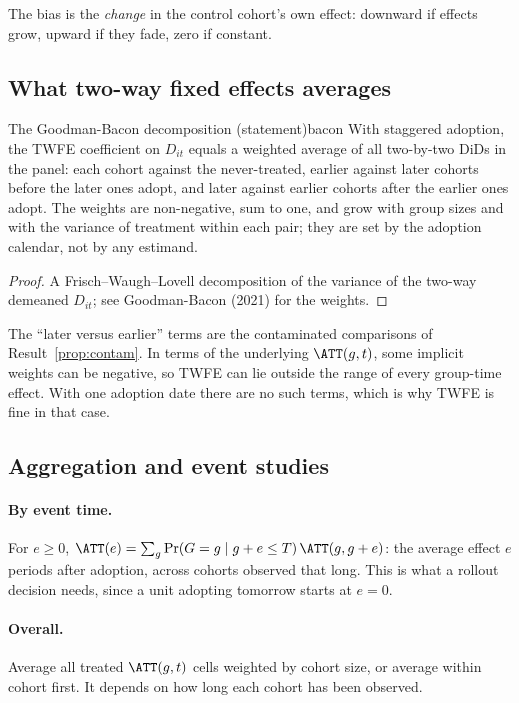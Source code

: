 \documentclass[11pt]{article}
\begin{document}
The bias is the \emph{change} in the control cohort's own effect: downward if effects grow, upward if they fade, zero if constant.

\subsection{What two-way fixed effects averages}

\begin{prop}{The Goodman-Bacon decomposition (statement)}{bacon}
With staggered adoption, the TWFE coefficient on $D_{it}$ equals a weighted average of all two-by-two DiDs in the panel: each cohort against the
never-treated, earlier against later cohorts before the later ones adopt, and later against earlier cohorts after the earlier ones adopt. The weights are
non-negative, sum to one, and grow with group sizes and with the variance of treatment within each pair; they are set by the adoption calendar, not by
any estimand.
\end{prop}
\begin{proof}
A Frisch--Waugh--Lovell decomposition of the variance of the two-way demeaned $D_{it}$; see Goodman-Bacon (2021) for the weights.
\end{proof}

The ``later versus earlier'' terms are the contaminated comparisons of Result~\ref{prop:contam}. In terms of the underlying $\ATT(g,t)$, some implicit weights
can be negative, so TWFE can lie outside the range of every group-time effect. With one adoption date there are no such terms, which is why TWFE is fine in
that case.

\subsection{Aggregation and event studies}

\paragraph{By event time.} For $e \ge 0$, $\ATT(e) = \sum_g \Pr(G = g \mid g + e \le T)\,\ATT(g, g+e)$: the average effect $e$ periods after adoption, across
cohorts observed that long. This is what a rollout decision needs, since a unit adopting tomorrow starts at $e = 0$.

\paragraph{Overall.} Average all treated $\ATT(g,t)$ cells weighted by cohort size, or average within cohort first. It depends on how long each cohort has been
observed.
\end{document}
